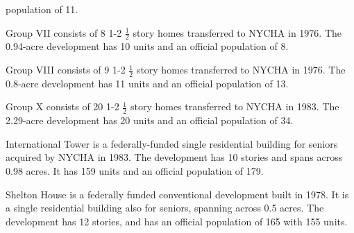 population of 11. \par \vspace{.7\baselineskip}Group VII consists of 8 1-2 $\frac{1}{2}$ story homes transferred to NYCHA in 1976. The 0.94-acre development has 10 units and an official population of 8.\par \vspace{.7\baselineskip}Group VIII consists of 9 1-2 $\frac{1}{2}$ story homes transferred to NYCHA in 1976. The 0.8-acre development has 11 units and an official population of 13. \par \vspace{.7\baselineskip}Group X consists of 20 1-2 $\frac{1}{2}$ story homes transferred to NYCHA in 1983. The 2.29-acre development has 20 units and an official population of 34.\par \vspace{.7\baselineskip}International Tower is a federally-funded single residential building for seniors acquired by NYCHA in 1983. The development has 10 stories and spans across 0.98 acres. It has 159 units and an official population of 179.\par \vspace{.7\baselineskip}Shelton House is a federally funded conventional development built in 1978. It is a single residential building also for seniors, spanning across 0.5 acres. The development has 12 stories, and has an official population of 165 with 155 units.